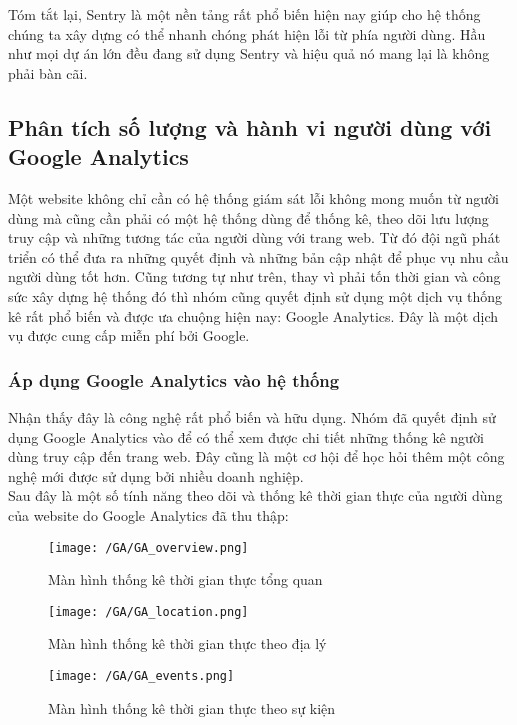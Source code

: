			 	Tóm tắt lại, Sentry là một nền tảng rất phổ biến hiện nay giúp cho hệ thống chúng ta xây dựng có thể nhanh chóng phát hiện lỗi từ phía người dùng. Hầu như mọi dự án lớn đều đang sử dụng Sentry và hiệu quả nó mang lại là không phải bàn cãi.
			 	
			 	\subsection{Phân tích số lượng và hành vi người dùng với Google Analytics}
			 	Một website không chỉ cần có hệ thống giám sát lỗi không mong muốn từ người dùng mà cũng cần phải có một hệ thống dùng để thống kê, theo dõi lưu lượng truy cập và những tương tác của người dùng với trang web. Từ đó đội ngũ phát triển có thể đưa ra những quyết định và những bản cập nhật để phục vụ nhu cầu người dùng tốt hơn. Cũng tương tự như trên, thay vì phải tốn thời gian và công sức xây dựng hệ thống đó thì nhóm cũng quyết định sử dụng một dịch vụ thống kê rất phổ biến và được ưa chuộng hiện nay: Google Analytics. Đây là một dịch vụ được cung cấp miễn phí bởi Google.
			 	
			 	\subsubsection{Áp dụng Google Analytics vào hệ thống}
			 	Nhận thấy đây là công nghệ rất phổ biến và hữu dụng. Nhóm đã quyết định sử dụng Google Analytics vào để có thể xem được chi tiết những thống kê người dùng truy cập đến trang web. Đây cũng là một cơ hội để học hỏi thêm một công nghệ mới được sử dụng bởi nhiều doanh nghiệp.\\
			 	
			 	Sau đây là một số tính năng theo dõi và thống kê thời gian thực của người dùng của website do Google Analytics đã thu thập:
			 	
			 	\begin{figure}[H]
			 		\texttt{[image: /GA/GA\_overview.png]}
			 		\centering
			 		\caption{Màn hình thống kê thời gian thực tổng quan}
			 	\end{figure}
			 	
			 	\begin{figure}[H]
			 		\texttt{[image: /GA/GA\_location.png]}
			 		\centering
			 		\caption{Màn hình thống kê thời gian thực theo địa lý}
			 	\end{figure}
			 	
			 	\begin{figure}[H]
			 		\texttt{[image: /GA/GA\_events.png]}
			 		\centering
			 		\caption{Màn hình thống kê thời gian thực theo sự kiện}
			 	\end{figure}
			 	

